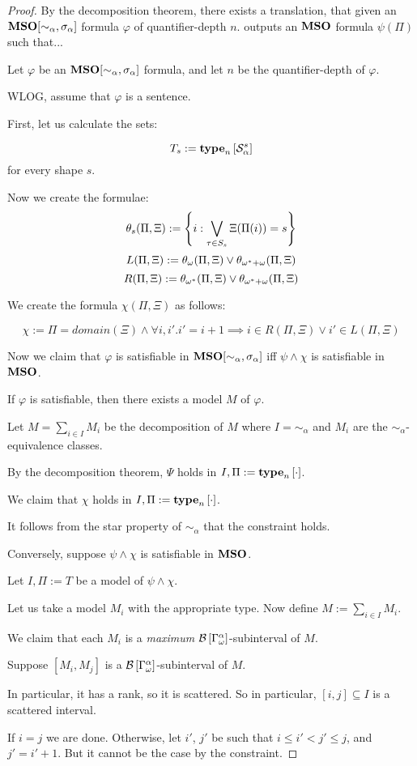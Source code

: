 \begin{proof}
  By the decomposition theorem, there exists a translation,
  that given an $\mathbf{MSO}[\sim_{\alpha}, \sigma_{\alpha}]$ formula $\varphi$ of quantifier-depth $n$.
  outputs an $\mathbf{MSO}$ formula $\psi(\Pi)$ such that...

  Let $\varphi$ be an $\mathbf{MSO}[\sim_{\alpha}, \sigma_{\alpha}]$ formula,
  and let $n$ be the quantifier-depth of $\varphi$.

  WLOG, assume that $\varphi$ is a sentence.

  First, let us calculate the sets:

  \[T_s := \mathbf{type}_{n} \left[ {\mathcal{S}^{s}_{\alpha}} \right]\]
  for every shape $s$.

  Now we create the formulae:
  \[\theta_s(\Pi, \Xi) := \left\{ {i : \bigvee_{\tau \in S_s}{\Xi(\Pi(i)) = s}} \right\}\]
  \[L(\Pi, \Xi) := \theta_{\omega}(\Pi, \Xi) \vee \theta_{\omega^\ast + \omega}(\Pi, \Xi)\]
  \[R(\Pi, \Xi) := \theta_{\omega^\ast}(\Pi, \Xi) \vee \theta_{\omega^\ast + \omega}(\Pi, \Xi)\]

  We create the formula $\chi(\Pi, \Xi)$ as follows:

  \[\chi := \Pi = domain(\Xi) \wedge \forall i, i'. i' = i + 1 \implies {i \in R(\Pi, \Xi) \vee i' \in L(\Pi, \Xi)}\]

  Now we claim that $\varphi$ is satisfiable in $\mathbf{MSO}[\sim_{\alpha}, \sigma_{\alpha}]$
  iff $\psi \land \chi$ is satisfiable in $\mathbf{MSO}$.

  If $\varphi$ is satisfiable, then there exists a model $M$ of $\varphi$.

  Let $M = \sum_{i \in I} M_i$ be the decomposition of $M$
  where $I = \sim_{\alpha}$ and $M_i$ are the $\sim_{\alpha}$-equivalence classes.

  By the decomposition theorem, $\Psi$ holds
  in $I, \Pi := \mathbf{type}_{n} \left[ {\cdot} \right]$.

  We claim that $\chi$ holds in $I, \Pi := \mathbf{type}_{n} \left[ {\cdot} \right]$.

  It follows from the star property of $\sim_{\alpha}$ that the constraint holds.

  Conversely, suppose $\psi \land \chi$ is satisfiable in $\mathbf{MSO}$.

  Let $I, \Pi := T$ be a model of $\psi \land \chi$.

  Let us take a model $M_i$ with the appropriate type.
  Now define $M := \sum_{i \in I} M_i$.

  We claim that each $M_i$ is a \emph{maximum} $\mathcal{B} \left[ {{\Gamma_{\omega}^{\alpha}}} \right]$-subinterval
  of $M$.

  Suppose $[M_i, M_j]$ is a $\mathcal{B} \left[ {{\Gamma_{\omega}^{\alpha}}} \right]$-subinterval of $M$.

  In particular, it has a rank, so it is scattered. So in particular,
  $[i, j] \subseteq I$ is a scattered interval.

  If $i = j$ we are done. Otherwise, let $i'$, $j'$ be such that $i \le i' < j' \le j$,
  and $j' = i' + 1$.  But it cannot be the case by the constraint.


\end{proof}


